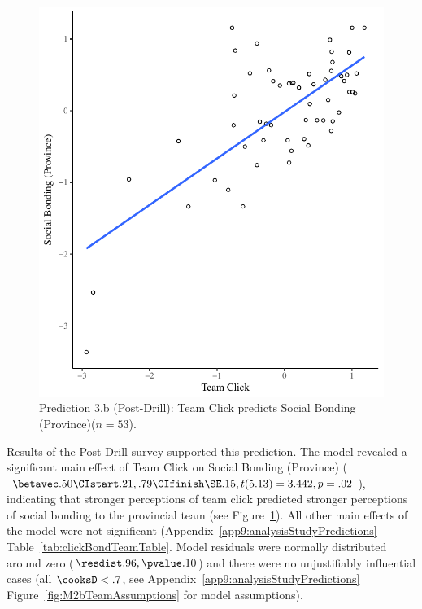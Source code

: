 \begin{CJK}{UTF8}{gbsn}

\begin{figure}
  \centering
    \includegraphics[width=0.5\linewidth,keepaspectratio] {images/groupClickTeamBondScatter}
    \caption{Prediction 3.b (Post-Drill): Team Click predicts Social Bonding (Province)($n = 53$).}
      \label{fig:groupClickTeamBondScatter}
\end{figure}



Results of the Post-Drill survey supported this prediction. The model revealed a significant main effect of Team Click on Social Bonding (Province) ($\betavec .50 \CIstart .21, .79 \CIfinish \SE .15, t(5.13) = 3.442, p = .02$), indicating that stronger perceptions of team click predicted stronger perceptions of social bonding to the provincial team (see Figure~\ref{fig:groupClickTeamBondScatter}).  All other main effects of the model were not significant (Appendix~\ref{app9:analysisStudyPredictions} Table~\ref{tab:clickBondTeamTable}.  Model residuals were normally distributed around zero ($\resdist .96, \pvalue .10$) and there were no unjustifiably influential cases (all $\cooksD < .7$, see Appendix~\ref{app9:analysisStudyPredictions} Figure~\ref{fig:M2bTeamAssumptions} for model assumptions).








\end{CJK}
